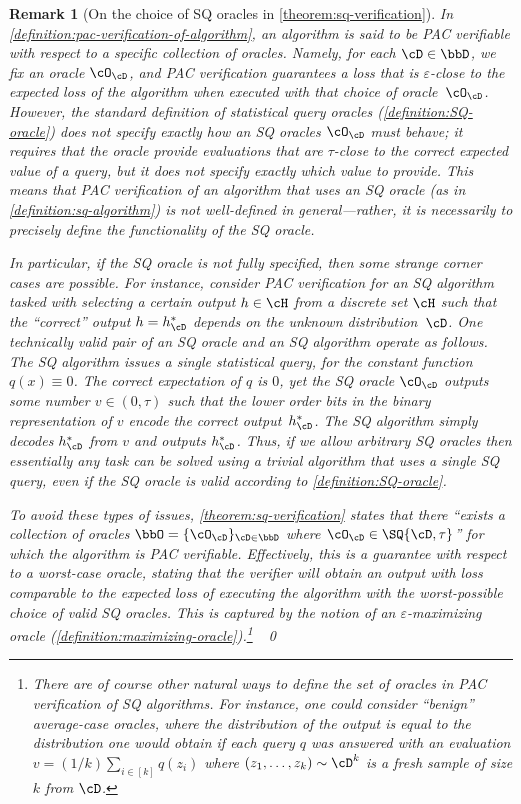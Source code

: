 \documentclass[11pt]{article}
\newtheorem{remark}[theorem]{Remark}
\begin{document}
\begin{remark}[On the choice of SQ oracles in \cref{theorem:sq-verification}]
	In \cref{definition:pac-verification-of-algorithm}, an algorithm is said to be PAC verifiable with respect to a specific collection of oracles. Namely, for each $\cD \in \bbD$, we fix an oracle $\cO_\cD$, and PAC verification guarantees a loss that is $\varepsilon$-close to the expected loss of the algorithm when executed with that choice of oracle~$\cO_\cD$. However, the standard definition of statistical query oracles (\cref{definition:SQ-oracle}) does not specify exactly how an SQ oracles $\cO_\cD$ must behave; it requires that the oracle provide evaluations  that are $\tau$-close to the correct expected value of a query, but it does not specify exactly which value to provide. This means that PAC verification of an algorithm that uses an SQ oracle (as in \cref{definition:sq-algorithm}) is not well-defined in general---rather, it is necessarily to precisely define the functionality of the SQ oracle. 

	In particular, if the SQ oracle is not fully specified, then some strange corner cases are possible. For instance, consider PAC verification for an SQ algorithm tasked with selecting a certain output $h \in \cH$ from a discrete set $\cH$ such that the ``correct'' output $h=h^*_\cD$ depends on the unknown distribution~$\cD$. One technically valid pair of an SQ oracle and an SQ algorithm operate as follows. The SQ algorithm issues a single statistical query, for the constant function $q(x) \equiv 0$. The correct expectation of $q$ is $0$, yet the SQ oracle $\cO_\cD$ outputs some number $v \in (0,\tau)$ such that the lower order bits in the binary representation of $v$ encode the correct output~$h^*_\cD$. The SQ algorithm simply decodes $h^*_\cD$ from $v$ and outputs $h^*_\cD$. Thus, if we allow arbitrary SQ oracles then essentially any task can be solved using a trivial algorithm that uses a single SQ query, even if the SQ oracle is valid according to \cref{definition:SQ-oracle}.

	To avoid these types of issues, \cref{theorem:sq-verification} states that there ``exists a collection of oracles $\bbO = \{\cO_\cD\}_{\cD \in \bbD}$ where $\cO_\cD \in \SQ{\cD,\tau}$'' for which the algorithm is PAC verifiable. Effectively, this is a guarantee with respect to a worst-case oracle, stating that the verifier will obtain an output with loss comparable to the expected loss of executing the algorithm with the worst-possible choice of valid SQ oracles. This is captured by the notion of an $\varepsilon$-maximizing oracle (\cref{definition:maximizing-oracle}).\footnote{
		There are of course other natural ways to define the set of oracles in PAC verification of SQ algorithms. For instance, one could consider ``benign'' average-case oracles, where the distribution of the output is equal to the distribution one would obtain if each query $q$ was answered with an evaluation $v = (1/k)\sum_{i \in [k]}q(z_i)$ where $(z_1,\dots,z_k)\sim \cD^k$ is a fresh sample of size $k$ from $\cD$.
	}
	~\qed
\end{remark}
\end{document}
